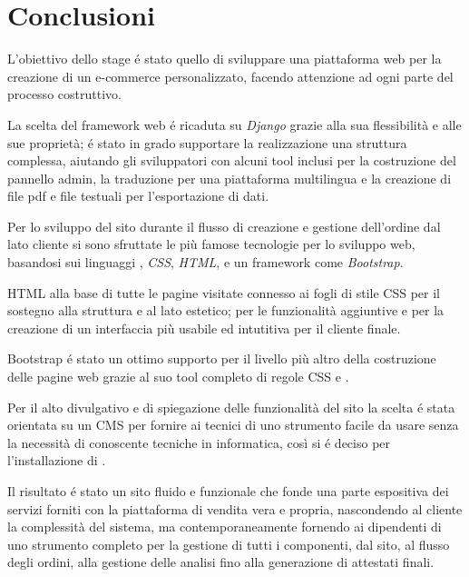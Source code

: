 \chapter{Conclusioni} 
\label{chp:conclusioni}
L’obiettivo dello stage é stato quello di sviluppare una piattaforma web per la creazione di un e-commerce personalizzato, facendo attenzione ad ogni parte del processo costruttivo.

La scelta del framework web é ricaduta su \emph{Django} grazie alla sua flessibilità e alle sue proprietà; é stato in grado supportare la realizzazione una struttura complessa, aiutando gli sviluppatori con alcuni tool inclusi per la costruzione del pannello admin, la traduzione per una piattaforma multilingua e la creazione di file pdf e file testuali per l'esportazione di dati.

Per lo sviluppo del sito durante il flusso di creazione e gestione dell'ordine dal lato cliente si sono sfruttate le più famose tecnologie per lo sviluppo web, basandosi sui linguaggi \emph{{\js}}, \emph{CSS}, \emph{HTML}, e un framework come \emph{Bootstrap}.

HTML alla base di tutte le pagine visitate connesso ai fogli di stile CSS per il sostegno alla struttura e al lato estetico; {\js} per le funzionalità aggiuntive e per la creazione di un interfaccia più usabile ed intutitiva per il cliente finale.

Bootstrap é stato un ottimo supporto per il livello più altro della costruzione delle pagine web grazie al suo tool completo di regole CSS e {\js}.

Per il alto divulgativo e di spiegazione delle funzionalità del sito la scelta é stata orientata su un CMS per fornire ai tecnici di {\fem} uno strumento facile da usare senza la necessità di conoscente tecniche in informatica, così si é deciso per l'installazione di {\wp}.

Il risultato é stato un sito fluido e funzionale che fonde una parte espositiva dei servizi forniti con la piattaforma di vendita vera e propria, nascondendo al cliente la complessità del sistema, ma contemporaneamente fornendo ai dipendenti di {\fem} uno strumento completo per la gestione di tutti i componenti, dal sito, al flusso degli ordini, alla gestione delle analisi fino alla generazione di attestati finali.